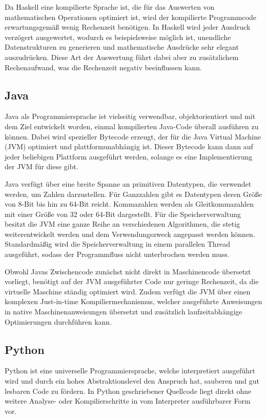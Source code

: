 \documentclass[11pt, parskip=half]{scrartcl}       %
\begin{document}
Da Haskell eine kompilierte Sprache ist, die für das Auswerten von mathematischen Operationen optimiert ist, wird der kompilierte Programmcode erwartungsgemäß wenig Rechenzeit benötigen.
In Haskell  wird jeder Ausdruck verzögert ausgewertet, wodurch es beispielsweise möglich ist, unendliche Datenstrukturen zu generieren und mathematische Ausdrücke sehr elegant auszudrücken.
Diese Art der Auswertung führt dabei aber zu zusätzlichem Rechenaufwand, was die Rechenzeit negativ beeinflussen kann.


\subsection{Java}

Java\cite{java_language} als Programmiersprache ist vielseitig verwendbar, objektorientiert und mit dem Ziel entwickelt worden, einmal kompilierten Java-Code überall ausführen zu können.
Dabei wird spezieller Bytecode erzeugt, der für die Java Virtual Machine (JVM) optimiert und plattformunabhängig ist.
Dieser Bytecode kann dann auf jeder beliebigen Plattform ausgeführt werden, solange es eine Implementierung der JVM für diese gibt.

Java verfügt über eine breite Spanne an primitiven Datentypen, die verwendet werden, um Zahlen darzustellen.
Für Ganzzahlen gibt es Datentypen deren Größe von 8-Bit bis hin zu 64-Bit reicht.
Kommazahlen werden als Gleitkommazahlen mit einer Größe von 32 oder 64-Bit dargestellt.
Für die Speicherverwaltung besitzt die JVM eine ganze Reihe an verschiedenen Algorithmen, die stetig weiterentwickelt werden und dem Verwendungszweck angepasst werden können.\cite{java_papers_garbage_collectors}
Standardmäßig wird die Speicherverwaltung in einem parallelen Thread ausgeführt, sodass der Programmfluss nicht unterbrochen werden muss.

Obwohl Javas Zwischencode zunächst nicht direkt in Maschinencode übersetzt vorliegt, benötigt auf der JVM ausgeführter Code nur geringe Rechenzeit, da die virtuelle Maschine ständig optimiert wird.
Zudem verfügt die JVM über einen komplexen Just-in-time Kompiliermechanismus, welcher ausgeführte Anweisungen in native Maschinenanweisungen übersetzt und zusätzlich laufzeitabhängige Optimierungen durchführen kann.


\subsection{Python}

Python\cite{python_language} ist eine universelle Programmiersprache, welche interpretiert ausgeführt wird und durch ein hohes Abstraktionslevel den Anspruch hat, sauberen und gut lesbaren Code zu fördern.
In Python geschriebener Quellcode liegt direkt ohne weitere Analyse- oder Kompilierschritte in vom Interpreter ausführbarer Form vor.
\end{document}
